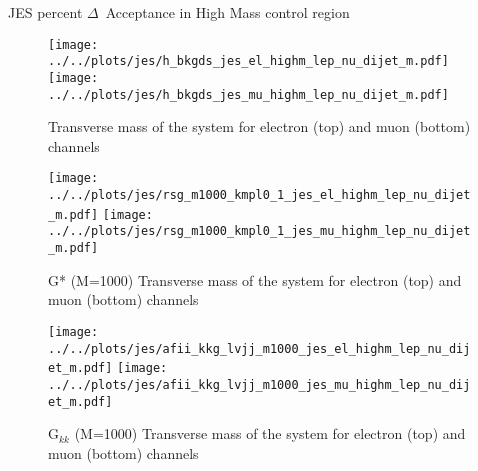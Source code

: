 \documentclass{article}
\begin{document}
\begin{table}[htbp]
  \centering
  \caption{JES percent $\Delta$~Acceptance in High Mass control region}
\end{table}

\begin{figure}[h]
  \centering
  \texttt{[image: ../../plots/jes/h\_bkgds\_jes\_el\_highm\_lep\_nu\_dijet\_m.pdf]}
  \texttt{[image: ../../plots/jes/h\_bkgds\_jes\_mu\_highm\_lep\_nu\_dijet\_m.pdf]}
  
  \caption{Transverse mass of the system for electron (top) and muon (bottom) channels}
\end{figure}

\begin{figure}[h]
  \centering
  \texttt{[image: ../../plots/jes/rsg\_m1000\_kmpl0\_1\_jes\_el\_highm\_lep\_nu\_dijet\_m.pdf]}
  \texttt{[image: ../../plots/jes/rsg\_m1000\_kmpl0\_1\_jes\_mu\_highm\_lep\_nu\_dijet\_m.pdf]}
  
  \caption{G* (M=1000) Transverse mass of the system for electron (top) and muon (bottom) channels}
\end{figure}

\begin{figure}[h]
  \centering
  \texttt{[image: ../../plots/jes/afii\_kkg\_lvjj\_m1000\_jes\_el\_highm\_lep\_nu\_dijet\_m.pdf]}
  \texttt{[image: ../../plots/jes/afii\_kkg\_lvjj\_m1000\_jes\_mu\_highm\_lep\_nu\_dijet\_m.pdf]}
  
  \caption{G$_{kk}$ (M=1000) Transverse mass of the system for electron (top) and muon (bottom) channels}
\end{figure}
\end{document}

